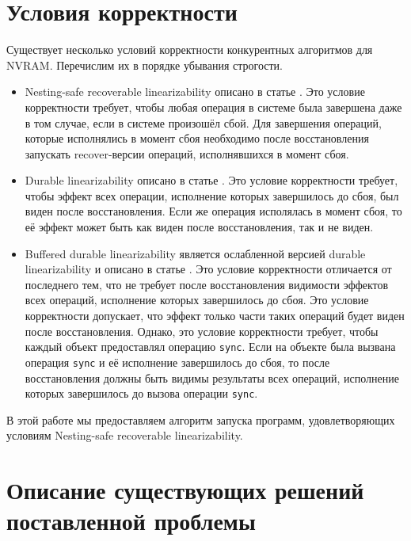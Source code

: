 \documentclass[times,specification,annotation]{itmo-student-thesis}
\begin{document}
\section{Условия корректности}

Существует несколько условий корректности конкурентных алгоритмов для NVRAM. Перечислим их в порядке убывания строгости.

\begin{itemize}
    \item Nesting-safe recoverable linearizability описано в статье \cite{attiya2018nesting}. Это условие корректности требует, чтобы любая операция в системе была завершена даже в том случае, если в системе произошёл сбой. Для завершения операций, которые исполнялись в момент сбоя необходимо после восстановления запускать recover-версии операций, исполнявшихся в момент сбоя.
    
    \item Durable linearizability описано в статье \cite{izraelevitz2016linearizability}. Это условие корректности требует, чтобы эффект всех операции, исполнение которых завершилось до сбоя, был виден после восстановления. Если же операция исполялась в момент сбоя, то её эффект может быть как виден после восстановления, так и не виден.
    
    \item Buffered durable linearizability является ослабленной версией durable linearizability и описано в статье \cite{friedman2018persistent}. Это условие корректности отличается от последнего тем, что не требует после восстановления видимости эффектов всех операций, исполнение которых завершилось до сбоя. Это условие корректности допускает, что эффект только части таких операций будет виден после восстановления. Однако, это условие корректности требует, чтобы каждый объект предоставлял операцию \texttt{sync}. Если на объекте была вызвана операция \texttt{sync} и её исполнение завершилось до сбоя, то после восстановления должны быть видимы результаты всех операций, исполнение которых завершилось до вызова операции \texttt{sync}.
    
\end{itemize}

\bigbreak

В этой работе мы предоставляем алгоритм запуска программ, удовлетворяющих условиям Nesting-safe recoverable linearizability. 

\section{Описание существующих решений поставленной проблемы}
\end{document}
